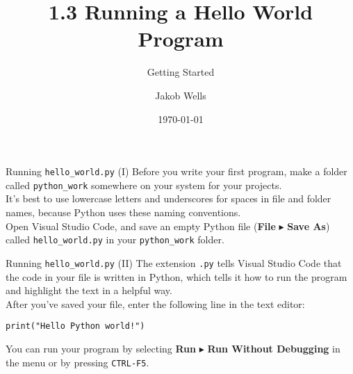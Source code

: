 \documentclass[aspectratio=169]{beamer}
\title{1.3 Running a Hello World Program}
\subtitle{Getting Started}
\author{Jakob Wells}
\begin{document}
\date{\today}


\begin{frame}
    \titlepage{}
\end{frame}


\begin{frame}[fragile]{Running \texttt{hello\_world.py} (I)}
    Before you write your first program, make a folder called \texttt{python\_work} somewhere on your system for your projects. \\
    \vspace{15pt}
    It's best to use lowercase letters and underscores for spaces in file and folder names, because Python uses these naming conventions.\\
    \vspace{15pt}
    Open Visual Studio Code, and save an empty Python file (\textbf{File} \(\blacktriangleright\) \textbf{Save As}) called \texttt{hello\_world.py} in your \texttt{python\_work} folder. \\
\end{frame}


\begin{frame}[fragile]{Running \texttt{hello\_world.py} (II)}
    The extension \texttt{.py} tells Visual Studio Code that the code in your file is written in Python, which tells it how to run the program and highlight the text in a helpful way. \\
    \vspace{15pt}
    After you've saved your file, enter the following line in the text editor:
    \vspace{5pt}
    \begin{Verbatim}
print("Hello Python world!")
    \end{Verbatim}
    \vspace{15pt}
    You can run your program by selecting \textbf{Run} \(\blacktriangleright\) \textbf{Run Without Debugging} in the menu or by pressing \texttt{CTRL-F5}. \\
\end{frame}
\end{document}
